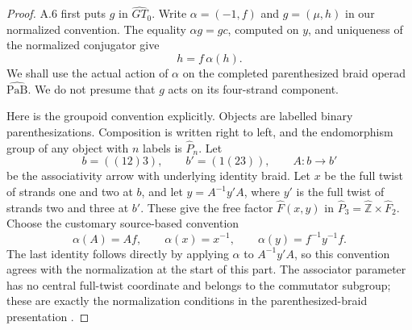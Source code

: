 \begin{proof}
A.6 first puts \(g\) in \(\widehat{GT}_0\). Write
\(\alpha=(-1,f)\) and \(g=(\mu,h)\) in our normalized
convention. The equality \(\alpha g=g c\), computed
on \(y\), and uniqueness of the normalized conjugator
give
\[
                         h=f\,\alpha(h).
 \tag{A.36.2}
\]
We shall use the actual action of \(\alpha\) on the
completed parenthesized braid operad
\(\widehat{\mathrm{PaB}}\). We do not presume that
\(g\) acts on its four-strand component.

Here is the groupoid convention explicitly. Objects are
labelled binary parenthesizations. Composition is
written right to left, and the endomorphism group of
any object with \(n\) labels is \(\widehat P_n\).
Let
\[
 b=((12)3),\qquad b'=(1(23)),\qquad A:b\longrightarrow b'
\]
be the associativity arrow with underlying identity
braid. Let \(x\) be the full twist of strands one and
two at \(b\), and let
\(y=A^{-1}y' A\), where \(y'\) is the full twist of
strands two and three at \(b'\). These give the free
factor \(\widehat F(x,y)\) in
\(\widehat P_3=\widehat{\mathbb Z}\times\widehat F_2\).
Choose the customary source-based convention
\[
             \alpha(A)=A f,
 \qquad \alpha(x)=x^{-1},
 \qquad \alpha(y)=f^{-1}y^{-1}f.
 \tag{A.36.3}
\]
The last identity follows directly by applying
\(\alpha\) to \(A^{-1}y'A\), so this convention
agrees with the normalization at the start of this
part. The associator parameter has no central full-twist
coordinate and belongs to the commutator subgroup;
these are exactly the normalization conditions in the
parenthesized-braid presentation
\cite[Definitions 6.10--6.11, Lemma 7.1 and Proposition 7.3]{CEBHR2019}.


\end{proof}
